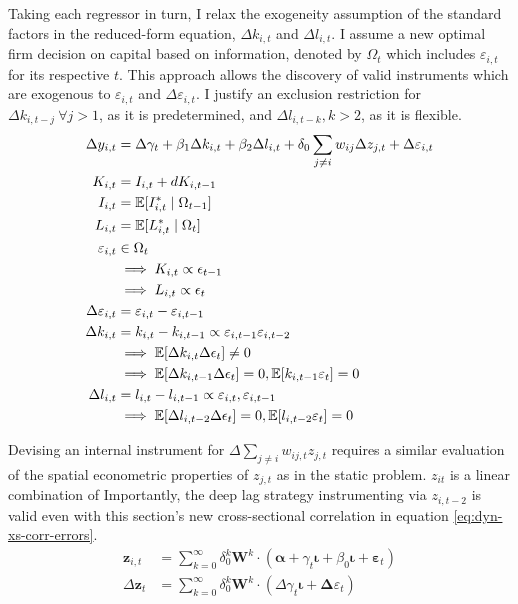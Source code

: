 Taking each regressor in turn, I relax the exogeneity assumption
of the standard factors in the reduced-form equation, $\Delta k_{i,t}$ and $\Delta l_{i,t}$.
I assume a new optimal firm decision on capital based on information,
denoted by $\Omega_t$ which includes $\varepsilon_{i,t}$ for its respective $t$.
This approach allows the discovery of valid instruments which are exogenous to $\varepsilon_{i,t}$
and $\Delta\varepsilon_{i,t}$.
I justify an exclusion restriction for $\Delta k_{i,t-j}\ \forall j>1$, as it is predetermined,
and $\Delta l_{i,t-k}, k>2$, as it is flexible.
\begin{align}
    \Delta y_{i,t} &= \Delta \gamma_t
                + \beta_1\Delta k_{i,t}
                + \beta_2\Delta l_{i,t}
                + \delta_0\sum_{j\neq i} w_{ij}\Delta z_{j,t}
                + \Delta\varepsilon_{i,t}
    \\
    \label{eq:dyn-k-pim}
    K_{i,t} &= I_{i,t} + dK_{i,t-1}
    \\
    \label{eq:dyn-inv-information}
    I_{i,t} &= \mathbb{E}[I_{i,t}^* \mid \Omega_{t-1}]
    \\
    \label{eq:dyn-l-information}
    L_{i,t} &= \mathbb{E}[L_{i,t}^* \mid \Omega_t] 
    \\ \notag
    \varepsilon_{i,t} &\in \Omega_t
    \\ \notag
    &\implies K_{i,t} \propto \epsilon_{t-1}
    \\ \notag
    &\implies L_{i,t} \propto \epsilon_{t}
    \\ \notag
    \Delta \varepsilon_{i,t} &= \varepsilon_{i,t} - \varepsilon_{i,t-1}
    \\ \notag
    \Delta k_{i,t} &= k_{i,t} - k_{i,t-1}
        \propto \varepsilon_{i,t-1} \varepsilon_{i,t-2}
    \\ \notag
    &\implies \mathbb E[\Delta k_{i,t} \Delta \epsilon_t] \neq 0
    \\
    &\implies \mathbb E[\Delta k_{i,t-1} \Delta \epsilon_t] = 0, \mathbb E[k_{i,t-1} \varepsilon_t]=0
    \\ \notag
    \Delta l_{i,t} &= l_{i,t} - l_{i,t-1}
        \propto \varepsilon_{i,t}, \varepsilon_{i,t-1}
    \\
    &\implies \mathbb E[\Delta l_{i,t-2} \Delta \epsilon_t] = 0, \mathbb E[l_{i,t-2} \varepsilon_t]=0
\end{align}

Devising an internal instrument for $\Delta \sum_{j\neq i} w_{ij,t}z_{j,t}$ requires
a similar evaluation of the spatial econometric properties of $z_{j,t}$ as in the static problem.
$z_{it}$ is a linear combination of 
Importantly, the deep lag strategy instrumenting via $z_{i,t-2}$ is valid
even with this section's new cross-sectional correlation in equation \ref{eq:dyn-xs-corr-errors}.
\begin{align}
    \mathbf z_{i,t} &= \sum_{k=0}^\infty \delta_0^k \mathbf W^k \cdot (\boldsymbol\alpha + \gamma_t \boldsymbol\iota + \beta_0\boldsymbol\iota + \boldsymbol\varepsilon_t)
    \\
    \Delta \mathbf z_t &= \sum_{k=0}^\infty \delta_0^k \mathbf W^k \cdot (\Delta \gamma_t \boldsymbol\iota + \boldsymbol\Delta\varepsilon_t)
\end{align}
